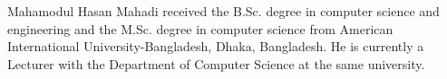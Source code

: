 \documentclass{ieeeaccess}
\begin{document}
\begin{IEEEbiographynophoto}{Mahamodul Hasan Mahadi}
received the B.Sc. degree in computer science and engineering and the M.Sc.
degree in computer science from American International University-Bangladesh,
Dhaka, Bangladesh. He is currently a Lecturer with the Department of Computer
Science at the same university.
\end{IEEEbiographynophoto}

\EOD
\end{document}
